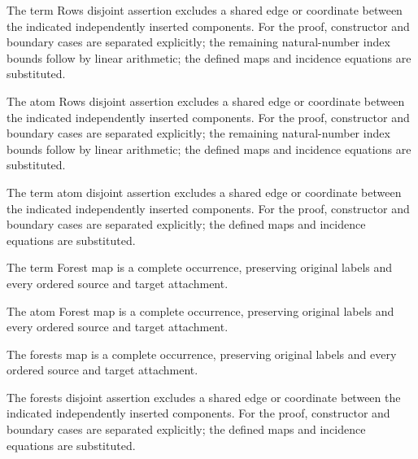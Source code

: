 The term Rows disjoint assertion excludes a shared edge or coordinate between the indicated independently inserted components.
For the proof, constructor and boundary cases are separated explicitly; the remaining natural-number index bounds follow by linear arithmetic; the defined maps and incidence equations are substituted.
\par{}

The atom Rows disjoint assertion excludes a shared edge or coordinate between the indicated independently inserted components.
For the proof, constructor and boundary cases are separated explicitly; the remaining natural-number index bounds follow by linear arithmetic; the defined maps and incidence equations are substituted.
\par{}

The term atom disjoint assertion excludes a shared edge or coordinate between the indicated independently inserted components.
For the proof, constructor and boundary cases are separated explicitly; the defined maps and incidence equations are substituted.
\par{}

The term Forest map is a complete occurrence, preserving original labels and every ordered source and target attachment.
\par{}

The atom Forest map is a complete occurrence, preserving original labels and every ordered source and target attachment.
\par{}

The forests map is a complete occurrence, preserving original labels and every ordered source and target attachment.
\par{}

The forests disjoint assertion excludes a shared edge or coordinate between the indicated independently inserted components.
For the proof, constructor and boundary cases are separated explicitly; the defined maps and incidence equations are substituted.
\par{}


